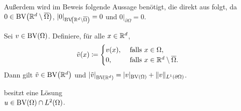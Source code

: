 Außerdem wird im Beweis folgende Aussage benötigt, die direkt aus \cite[S. 183,
Theorem 1]{EG92} folgt, da
$0\in\textup{BV}\!\left(\mathbb{R}^d\setminus\overline\Omega\right)$,
$|0|_{\textup{BV}\!\left(\mathbb{R}^d\setminus\overline\Omega\right)}=0$ und
$0|_{\partial\Omega}=0$.

\begin{lemma}
  \label{lem:bvExtension}
  Sei $v\in\textup{BV}(\Omega)$.
  Definiere, für alle $x\in\mathbb{R}^d$,
  \begin{align*}
    \tilde{v}(x)\coloneqq
    \begin{cases}
      v(x),  &\text{ falls } x\in\Omega,\\
      0,     &\text{ falls } x\in\mathbb{R}^d\setminus\overline\Omega.
    \end{cases} 
  \end{align*}
  Dann gilt $\tilde{v}\in\textup{BV}\!\left(\mathbb{R}^d\right)$ und
  $\left|\tilde{v}\right|_{\textup{BV}\!\left(\mathbb{R}^d\right)}
  = |v|_{\textup{BV}(\Omega)}+\Vert v\Vert_{L^1(\partial\Omega)}$.
\end{lemma}

\begin{theorem}
  \label{thm:contProblemExistence}
   besitzt eine Lösung \\$u\in\textup{BV}(\Omega)\cap
  L^2(\Omega)$.
\end{theorem}

